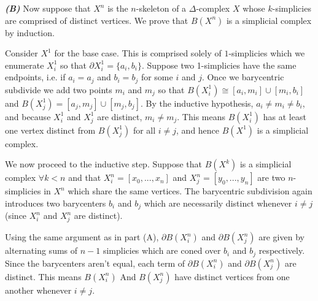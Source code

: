 \begin{homework}[e]
\begin{prf}
    \bigskip

    \noindent \textbf{\emph{(B)}}\hspace{1em} Now suppose that $X^n$ is the $n$-skeleton of a $\Delta$-complex $X$ whose $k$-simplicies are comprised of distinct vertices. We prove that $B(X^n)$ is a simplicial complex by induction.

    Consider $X^1$ for the base case. This is comprised solely of $1$-simplicies which we enumerate $X^1_i$ so that $\partial X^1_i = \{a_i,b_i\}$. Suppose two 1-simplicies have the same endpoints, i.e. if $a_i = a_j$ and $b_i = b_j$ for some $i$ and $j$. Once we barycentric subdivide we add two points $m_i$ and $m_j$ so that $B(X^1_i) \cong [a_i,m_i]\cup [m_i,b_i]$ and $B(X^1_j) = [a_j,m_j]\cup [m_j,b_j]$. By the inductive hypothesis, $a_i \neq m_i \neq b_i$, and because $X^1_i$ and $X^1_j$ are distinct, $m_i \neq m_j$. This means $B(X^1_i)$ has at least one vertex distinct from $B(X^1_j)$ for all $i \neq j$, and hence $B(X^1)$ is a simplicial complex.

    We now proceed to the inductive step. Suppose that $B(X^k)$ is a simplicial complex $\forall k < n$ and that $X^n_i = [x_0,...,x_n]$ and $X^n_j = [y_0,...,y_n]$ are two $n$-simplicies in $X^n$ which share the same vertices. The barycentric subdivision again introduces two barycenters $b_i$ and $b_j$ which are necessarily distinct whenever $i\neq j$ (since $X^n_i$ and $X^n_j$ are distinct).

    Using the same argument as in part (A), $\partial B(X^n_i)$ and $\partial B(X^n_j)$ are given by alternating sums of $n-1$ simplicies which are coned over $b_i$ and $b_j$ respectively. Since the barycenters aren't equal, each term of $\partial B(X^n_i)$ and $\partial B(X^n_j)$ are distinct. This means $B(X^n_i)$ And $B(X^n_j)$ have distinct vertices from one another whenever $i\neq j$.


\end{prf}
\end{homework}
